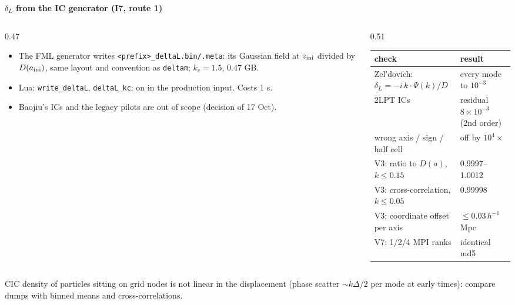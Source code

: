 \documentclass[UTF8]{beamer}
\newcommand{\examplebox}[2]{%
  \begin{tcolorbox}[colframe=darkcardinal,colback=boxgray,title=#1]
    #2
  \end{tcolorbox}
}
\begin{document}
\begin{frame}{\textbf{$\delta_L$ from the IC generator (I7, route 1)}}
  \small
  \begin{columns}[T]
    \begin{column}{0.47\textwidth}
      \begin{itemize}
        \item The FML generator writes \texttt{<prefix>\_deltaL.bin/.meta}: its Gaussian field at $z_{\rm ini}$
          divided by $D(a_{\rm ini})$, same layout and convention as \texttt{deltam}; $k_c = 1.5$, 0.47 GB.
        \item Lua: \texttt{write\_deltaL}, \texttt{deltaL\_kc}; on in the production input. Costs 1 s.
        \item Baojiu's ICs and the legacy pilots are out of scope (decision of 17 Oct).
      \end{itemize}
    \end{column}
    \begin{column}{0.51\textwidth}
      \scriptsize
      \begin{tabular}{@{}ll@{}}
        \toprule
        check & result \\
        \midrule
        Zel'dovich: $\delta_L = -i\,k\cdot\Psi(k)/D$ & every mode to $10^{-3}$ \\
        2LPT ICs & residual $8\times10^{-3}$ (2nd order) \\
        wrong axis / sign / half cell & off by $10^4\times$ \\
        V3: ratio to $D(a)$, $k \le 0.15$ & 0.9997--1.0012 \\
        V3: cross-correlation, $k \le 0.05$ & 0.99998 \\
        V3: coordinate offset per axis & $\le 0.03\,h^{-1}$Mpc \\
        V7: 1/2/4 MPI ranks & identical md5 \\
        \bottomrule
      \end{tabular}
    \end{column}
  \end{columns}
  \examplebox{Lesson}{%
    CIC density of particles sitting on grid nodes is not linear in the displacement (phase scatter
    $\sim k\Delta/2$ per mode at early times): compare dumps with binned means and cross-correlations.
  }
\end{frame}
\end{document}
